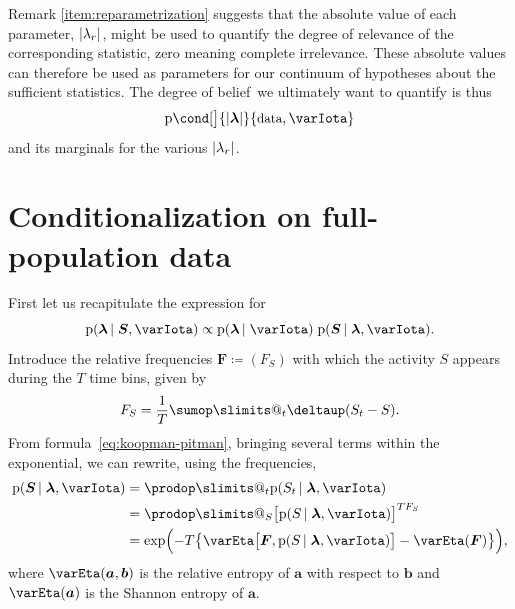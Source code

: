 \documentclass[\ifafour a4paper,12pt,\else a5paper,10pt,\fi%
onecolumn,oneside,article,%
british%
]{memoir}
\makeatletter
\theoremstyle{remark}
\theoremstyle{innote}
\def\sum{\DOTSI\sumop\slimits@}
\def\prod{\DOTSI\prodop\slimits@}
\newcommand*{\delt}{\deltaup}%
\newcommand*{\defd}{\coloneqq}
\DeclarePairedDelimiter\abs{\lvert}{\rvert}
\newcommand*{\pf}{\mathrm{p}}%
\renewcommand*{\|}{\nonscript\,\vert\nonscript\;\mathopen{}}
\newcommand*{\tsum}{\mathop{\textstyle\sum}\nolimits}
\newcommand*{\ptext}[1]{\text{\small #1}}
\newcommand*{\dob}{degree of belief}
\newcommand*{\yS}{S}
\newcommand*{\ySt}{\bm{\yS}}
\newcommand*{\yll}{\lambda}
\newcommand*{\yl}{\bm{\lambda}}
\newcommand*{\yg}{g}
\newcommand*{\yI}{\varIota}
\newcommand*{\yF}{\bm{F}}
\newcommand*{\yH}{\varEta}
\makeatother
\begin{document}
Remark \ref{item:reparametrization} suggests that the absolute value of
each parameter, $\abs{\yll_{r}}$, might be used to quantify the degree of
relevance of the corresponding statistic, zero meaning complete
irrelevance. These absolute values can therefore be used as parameters for
our continuum of hypotheses about the sufficient statistics. The \dob\ we
ultimately want to quantify is thus
\begin{equation}
  \label{eq:posterior_hypotheses_data}
  \pf\cond[\big]{\abs{\yl}}{\ptext{data}, \yI}
\end{equation}
and its marginals for the various $\abs{\yll_{r}}$.

\section{Conditionalization on full-population data}
\label{sec:full-pop_data}

First let us recapitulate the expression for
\begin{equation}
  \label{eq:posterior_given_full_population}
  \pf(\yl \| \ySt, \yI) \propto \pf(\yl \| \yI)\;
  \pf(\ySt \| \yl, \yI).
\end{equation}
Introduce the relative frequencies $\yF \defd (F_{\yS})$ with which the
activity $\yS$ appears during the $T$ time bins, given by
\begin{equation}
  \label{eq:frequencies}
  F_{\yS} = \frac{1}{T}\sum_{t}\delt(\yS_{t}-\yS).
\end{equation}
From formula~\eqref{eq:koopman-pitman}, bringing several terms within the
exponential, we can rewrite, using the frequencies,
\begin{equation}
  \label{eq:to_maxent}
  \begin{split}
  \pf(\ySt \| \yl, \yI) &= \prod_{t} \pf(\yS_{t} \| \yl, \yI)
    \\ &=
    \prod_{\yS}\bigl[ \pf(\yS \| \yl, \yI) \bigr]^{T F_{\yS}}
    \\ &=
    \exp\Bigl(-T\bigl\{
    \yH\bigl[\yF, \pf(\yS \| \yl, \yI)\bigr]
    -\yH(\yF)\bigr\}\Bigr),
\end{split}
\end{equation}
where $\yH(\bm{a},\bm{b})$ is the relative entropy of $\bm{a}$ with respect
to $\bm{b}$ and $\yH(\bm{a})$ is the Shannon entropy of $\bm{a}$.
\end{document}
